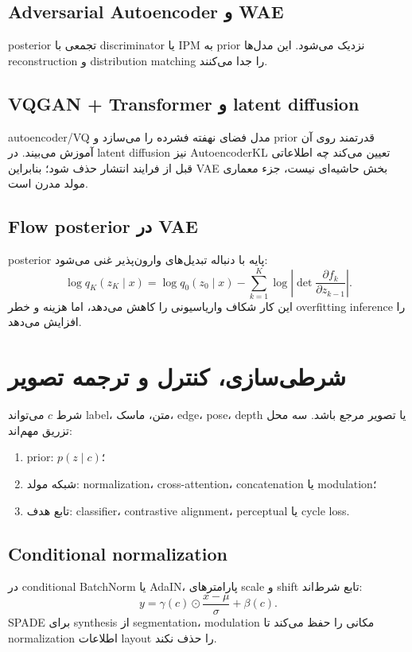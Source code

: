 \documentclass[12pt,openany,oneside]{book}
\begin{document}
\subsection{Adversarial Autoencoder و WAE}
posterior تجمعی با discriminator یا IPM به prior نزدیک می‌شود. این مدل‌ها reconstruction و distribution matching را جدا می‌کنند.

\subsection{VQGAN + Transformer و latent diffusion}
autoencoder/VQ مدل فضای نهفته فشرده را می‌سازد و prior قدرتمند روی آن آموزش می‌بیند. در latent diffusion نیز AutoencoderKL تعیین می‌کند چه اطلاعاتی قبل از فرایند انتشار حذف شود؛ بنابراین VAE بخش حاشیه‌ای نیست، جزء معماری مولد مدرن است.

\subsection{Flow posterior در VAE}
posterior پایه با دنباله تبدیل‌های وارون‌پذیر غنی می‌شود:
\begin{equation}
 \log q_K(z_K\mid x)=\log q_0(z_0\mid x)-\sum_{k=1}^K\log\left|\det\frac{\partial f_k}{\partial z_{k-1}}\right|.
\end{equation}
این کار شکاف واریاسیونی را کاهش می‌دهد، اما هزینه و خطر overfitting inference را افزایش می‌دهد.

\section{شرطی‌سازی، کنترل و ترجمه تصویر}
شرط $c$ می‌تواند label، متن، ماسک، edge، pose، depth یا تصویر مرجع باشد. سه محل تزریق مهم‌اند:
\begin{enumerate}
\item prior: $p(z\mid c)$؛
\item شبکه مولد: normalization، cross-attention، concatenation یا modulation؛
\item تابع هدف: classifier، contrastive alignment، perceptual یا cycle loss.
\end{enumerate}

\subsection{Conditional normalization}
در conditional BatchNorm یا AdaIN، پارامترهای scale و shift تابع شرط‌اند:
\begin{equation}
 y=\gamma(c)\odot\frac{x-\mu}{\sigma}+\beta(c).
\end{equation}
SPADE برای synthesis از segmentation، modulation مکانی را حفظ می‌کند تا normalization اطلاعات layout را حذف نکند.
\end{document}
